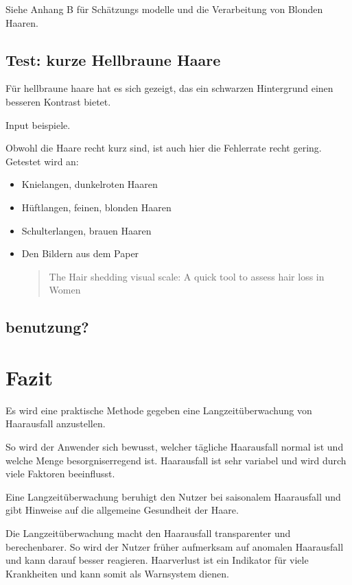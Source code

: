 \documentclass[german,a4paper,12pt]{llncs}
\begin{document}
Siehe Anhang B für Schätzungs modelle und die Verarbeitung von Blonden Haaren.

\subsection{Test: kurze Hellbraune Haare}

Für hellbraune haare hat es sich gezeigt, das ein schwarzen Hintergrund einen besseren Kontrast bietet.

Input beispiele.

Obwohl die Haare recht kurz sind, ist auch hier die Fehlerrate recht gering. 
Getestet wird an:
\begin{itemize}
	\item Knielangen, dunkelroten Haaren
	\item Hüftlangen, feinen, blonden Haaren
	\item Schulterlangen, brauen Haaren
	\item Den Bildern aus dem Paper \blockquote{The Hair shedding visual scale: A quick tool to assess hair loss in Women} 
\end{itemize}

\subsection{benutzung?}

\section{Fazit}
Es wird eine praktische Methode gegeben eine Langzeitüberwachung von Haarausfall anzustellen. 

So wird der Anwender sich bewusst, welcher tägliche Haarausfall normal ist und welche Menge besorgniserregend ist. Haarausfall ist sehr variabel und wird durch viele Faktoren beeinflusst. 

Eine Langzeitüberwachung beruhigt den Nutzer bei saisonalem Haarausfall und gibt Hinweise auf die allgemeine Gesundheit der Haare. 

Die Langzeitüberwachung macht den Haarausfall transparenter und berechenbarer. So wird der Nutzer früher aufmerksam auf anomalen Haarausfall und kann darauf besser reagieren. Haarverlust ist ein Indikator für viele Krankheiten und kann somit als Warnsystem dienen.





\newpage

\appendix


\printbibliography
\end{document}
